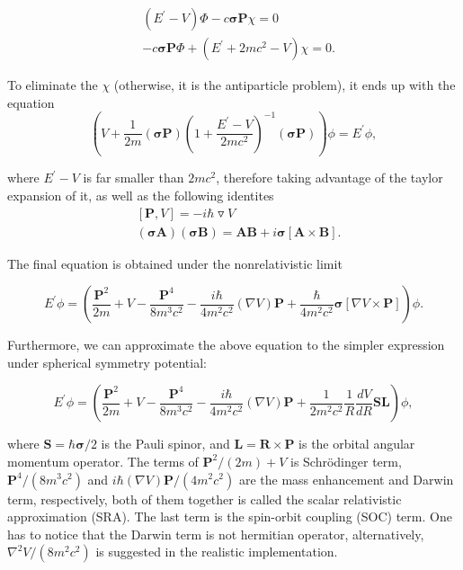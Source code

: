 \documentclass[a4paper, 12pt, titlepage,oneside,drop]{kthesis}
\begin{document}
\begin{equation}
\begin{split}
&(E^{\prime} - V) \Phi - c \boldsymbol{\sigma} \textbf{P} \chi = 0\\                
&-c\boldsymbol{\sigma} \textbf{P} \Phi + (E^{\prime}+2mc^2-V)\chi = 0.
\end{split}
\end{equation}

\noindent To eliminate the $\chi$ (otherwise, it is the antiparticle problem), it ends up with the equation
  \begin{equation}
(V + \frac{1}{2m} (\boldsymbol{\sigma} \textbf{P}) (1+\frac{E^{\prime}-V}{2mc^2})^{-1} (\boldsymbol{\sigma} \textbf{P}) )\phi=E^{\prime}\phi,
\end{equation}

\noindent where ${E^{\prime}-V}$ is far smaller than ${2mc^2}$, therefore taking advantage of the taylor expansion of it,  as well as the following identites
\begin{equation}
\begin{split}
& [\textbf{P}, V ]= -i \hbar \triangledown V \\                
&(\boldsymbol{\sigma} \textbf{A} )(\boldsymbol{\sigma} \textbf{B}) = \textbf{A} \textbf{B} + i\boldsymbol{\sigma}[\textbf{A} \times \textbf{B}].
\end{split}
\end{equation}

The final equation is obtained under the nonrelativistic limit

\begin{equation}
E^{\prime} \phi = (\frac{\textbf{P}^2}{2m} + V - \frac{\textbf{P}^4}{8 {m}^3 {c}^2}-\frac{i\hbar}{4{m}^2 {c}^2} (\nabla{V})\textbf{P}+\frac{\hbar}{4 m^2 c^2} \boldsymbol{\sigma}[\nabla{V} \times \textbf{P}]) \phi.
\end{equation}

Furthermore, we can approximate the above equation to the simpler expression under spherical symmetry potential:

\begin{equation}
 E^{\prime} \phi = (\frac{\textbf{P}^2}{2m} +V - \frac{\textbf{P}^4}{8 {m}^3 {c}^2}-\frac{i\hbar}{4{m}^2 {c}^2} (\nabla{V})\textbf{P}+\frac{1}{2 m^2 c^2} \frac{1}{R} \frac{dV}{dR}\textbf{S}\textbf{L}) \phi,
\end{equation}

\noindent where $\textbf{S}={\hbar}{\boldsymbol{\sigma}}/2$ is the Pauli spinor, and $\textbf{L}=\textbf{R} \times \textbf{P}$ is the orbital
angular momentum operator. The terms of ${\textbf{P}^2}/(2m) + V$ is Schrödinger term,  ${\textbf{P}^4}/(8 {m}^3 {c}^2)$ and ${i\hbar} (\nabla{V})\textbf{P} /(4{m}^2 {c}^2)$  are the mass enhancement 
and Darwin term, respectively, both of them together is called the scalar relativistic approximation (SRA). The last term is the spin-orbit coupling (SOC) term. One has to
notice that the Darwin term is not hermitian operator, alternatively, $\nabla^2{V} /(8{m}^2 {c}^2)$ is suggested in the realistic implementation.
\end{document}
